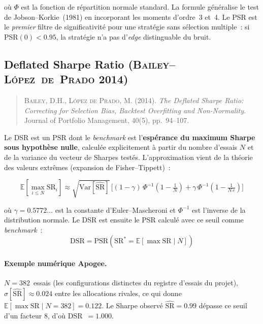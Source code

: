 où $\Phi$ est la fonction de répartition normale standard. La formule généralise le test de Jobson--Korkie~(1981) en incorporant les moments d'ordre~3 et~4. Le PSR est le \emph{premier} filtre de significativité pour une stratégie sans sélection multiple~: si PSR$(0) < 0.95$, la stratégie n'a pas d'\emph{edge} distinguable du bruit.

\subsection{Deflated Sharpe Ratio (\textsc{Bailey--L\'opez~de~Prado} 2014)}
\label{app:dsr}

\begin{quote}\small
\textsc{Bailey}, D.H., \textsc{L\'opez de Prado}, M. (2014). \emph{The Deflated Sharpe Ratio: Correcting for Selection Bias, Backtest Overfitting and Non-Normality}. Journal of Portfolio Management, 40(5), pp.~94--107.
\end{quote}

Le DSR est un PSR dont le \emph{benchmark} est l'\textbf{espérance du maximum Sharpe sous hypothèse nulle}, calculée explicitement à partir du nombre d'essais $N$ et de la variance du vecteur de Sharpes testés. L'approximation vient de la théorie des valeurs extrêmes (expansion de Fisher--Tippett)~:

\begin{equation}
\mathbb{E}\!\left[\max_{i \leq N} \mathrm{SR}_{i}\right]
\approx \sqrt{\mathrm{Var}[\widehat{\mathrm{SR}}]} \,\Big[
(1 - \gamma)\,\Phi^{-1}\!\left(1 - \tfrac{1}{N}\right)
+ \gamma\,\Phi^{-1}\!\left(1 - \tfrac{1}{N\,e}\right)
\Big]
\label{eq:expected_max_sharpe}
\end{equation}

où $\gamma = 0.5772\ldots$ est la constante d'Euler--Mascheroni et $\Phi^{-1}$ est l'inverse de la distribution normale. Le DSR est ensuite le PSR calculé avec ce seuil comme \emph{benchmark}~:
\begin{equation}
\mathrm{DSR} = \mathrm{PSR}\!\left(\mathrm{SR}^{*} = \mathbb{E}[\max \mathrm{SR}\mid N]\right)
\label{eq:dsr}
\end{equation}

\paragraph{Exemple numérique Apogee.} $N = 382$~essais (les configurations distinctes du registre d'essais du projet), $\widehat{\sigma}[\widehat{\mathrm{SR}}] \approx 0.024$ entre les allocations rivales, ce qui donne $\mathbb{E}[\max \mathrm{SR}\mid N = 382] = 0.122$. Le Sharpe observé $\widehat{\mathrm{SR}} = 0.99$ dépasse ce seuil d'un facteur $8$, d'où DSR~$= 1.000$.

